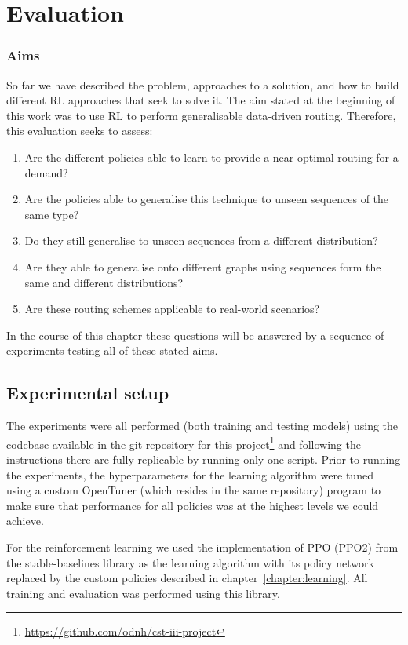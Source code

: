 \chapter{Evaluation}
\label{chapter:evaluation}

\subsection{Aims}
So far we have described the problem, approaches to a solution, and how to build different RL approaches that seek to solve it. The aim stated at the beginning of this work was to use RL to perform generalisable data-driven routing. Therefore, this evaluation seeks to assess:

\begin{enumerate}
\item Are the different policies able to learn to provide a near-optimal routing for a demand?
\item Are the policies able to generalise this technique to unseen sequences of the same type?
\item Do they still generalise to unseen sequences from a different distribution?
\item Are they able to generalise onto different graphs using sequences form the same and different distributions?
\item Are these routing schemes applicable to real-world scenarios?
\end{enumerate}

In the course of this chapter these questions will be answered by a sequence of experiments testing all of these stated aims.


\section{Experimental setup}
The experiments were all performed (both training and testing models) using the codebase available in the git repository for this project\footnote{\url{https://github.com/odnh/cst-iii-project}} and following the instructions there are fully replicable by running only one script. Prior to running the experiments, the hyperparameters for the learning algorithm were tuned using a custom OpenTuner\cite{ansel2014opentuner} (which resides in the same repository) program to make sure that performance for all policies was at the highest levels we could achieve.

For the reinforcement learning we used the implementation of PPO (PPO2) from the stable-baselines\cite{stable-baselines} library as the learning algorithm with its policy network replaced by the custom policies described in chapter~\ref{chapter:learning}. All training and evaluation was performed using this library.


